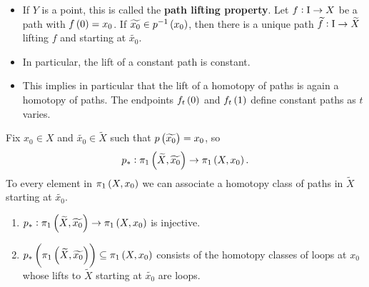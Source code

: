 \begin{remark*}
\hfill
\begin{itemize}
\item If $ Y $ is a point, this is called the \textbf{path lifting property}. Let $ f : \mathrm{I} \to X $ be a path with $ f\br{0} = x_0 $. If $ \widetilde{x_0} \in p^{-1}\br{x_0} $, then there is a unique path $ \widetilde{f} : \mathrm{I} \to \widetilde{X} $ lifting $ f $ and starting at $ \widetilde{x_0} $.
\item In particular, the lift of a constant path is constant.
\item This implies in particular that the lift of a homotopy of paths is again a homotopy of paths. The endpoints $ f_t\br{0} $ and $ f_t\br{1} $ define constant paths as $ t $ varies.
\end{itemize}
\end{remark*}

Fix $ x_0 \in X $ and $ \widetilde{x_0} \in \widetilde{X} $ such that $ p\br{\widetilde{x_0}} = x_0 $, so
$$ p_* : \pi_1\br{\widetilde{X}, \widetilde{x_0}} \to \pi_1\br{X, x_0}. $$
To every element in $ \pi_1\br{X, x_0} $ we can associate a homotopy class of paths in $ \widetilde{X} $ starting at $ \widetilde{x_0} $.

\pagebreak

\begin{proposition}
\label{prop:1.31}
\hfill
\begin{enumerate}
\item $ p_* : \pi_1\br{\widetilde{X}, \widetilde{x_0}} \to \pi_1\br{X, x_0} $ is injective.
\item $ p_*\br{\pi_1\br{\widetilde{X}, \widetilde{x_0}}} \subseteq \pi_1\br{X, x_0} $ consists of the homotopy classes of loops at $ x_0 $ whose lifts to $ \widetilde{X} $ starting at $ \widetilde{x_0} $ are loops.
\end{enumerate}
\end{proposition}

